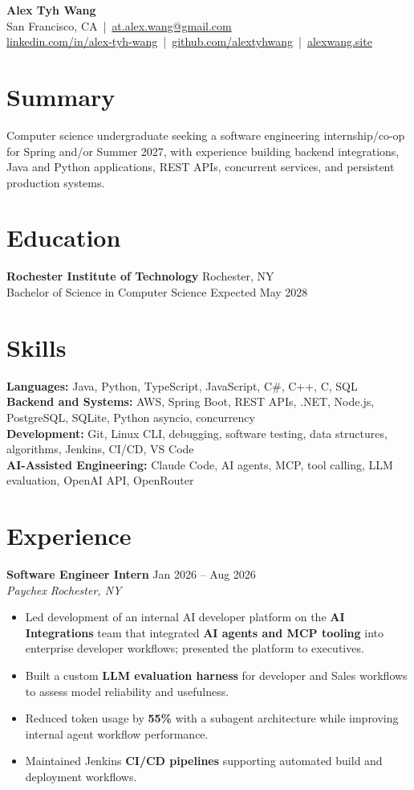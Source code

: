 \documentclass[10pt,letterpaper]{article}
\newif\ifresumeFirstRole
\newcommand{\resumeRole}[4]{%
  \ifresumeFirstRole
    \global\resumeFirstRolefalse
  \else
    \vspace{0pt plus 1fill}%
  \fi
  \textbf{#1} \hfill #2\\
  \textit{#3} \hfill \textit{#4}
}
\begin{document}
\begin{center}
{\Large \textbf{Alex Tyh Wang}}\\
San Francisco, CA \,|\, \href{mailto:at.alex.wang@gmail.com}{at.alex.wang@gmail.com}\\
\small \href{https://www.linkedin.com/in/alex-tyh-wang/}{linkedin.com/in/alex-tyh-wang} \,|\, \href{https://github.com/alextyhwang}{github.com/alextyhwang} \,|\, \href{https://alexwang.site}{alexwang.site}
\end{center}

\section*{Summary}
Computer science undergraduate seeking a software engineering internship/co-op for Spring and/or Summer 2027, with experience building backend integrations, Java and Python applications, REST APIs, concurrent services, and persistent production systems.

\section*{Education}
\textbf{Rochester Institute of Technology} \hfill Rochester, NY\\
Bachelor of Science in Computer Science \hfill Expected May 2028

\section*{Skills}
\textbf{Languages:} Java, Python, TypeScript, JavaScript, C\#, C++, C, SQL\\
\textbf{Backend and Systems:} AWS, Spring Boot, REST APIs, .NET, Node.js, PostgreSQL, SQLite, Python asyncio, concurrency\\
\textbf{Development:} Git, Linux CLI, debugging, software testing, data structures, algorithms, Jenkins, CI/CD, VS Code\\
\textbf{AI-Assisted Engineering:} Claude Code, AI agents, MCP, tool calling, LLM evaluation, OpenAI API, OpenRouter

\section*{Experience}
\resumeRole{Software Engineer Intern}{Jan 2026 -- Aug 2026}{Paychex}{Rochester, NY}
\begin{itemize}
  \item Led development of an internal AI developer platform on the \textbf{AI Integrations} team that integrated \textbf{AI agents and MCP tooling} into enterprise developer workflows; presented the platform to executives.
  \item Built a custom \textbf{LLM evaluation harness} for developer and Sales workflows to assess model reliability and usefulness.
  \item Reduced token usage by \textbf{55\%} with a subagent architecture while improving internal agent workflow performance.
  \item Maintained Jenkins \textbf{CI/CD pipelines} supporting automated build and deployment workflows.
\end{itemize}
\end{document}
